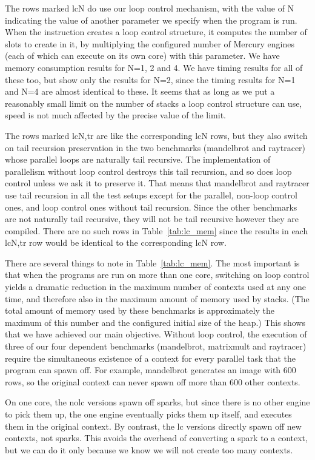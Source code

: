 The rows marked lcN do use our loop control mechanism,
with the value of N indicating
the value of another parameter we specify when the program is run.
When the  instruction
creates a loop control structure,
it computes the number of slots to create in it,
by multiplying the configured number of Mercury engines
(each of which can execute on its own core)
with this parameter.
We have memory consumption results for N=1, 2 and 4.
We have timing results for all of these too,
but show only the results for N=2,
since the timing results for N=1 and N=4 are almost identical to these.
It seems that as long as we put a reasonably small limit
on the number of stacks a loop control structure can use,
speed is not much affected by the precise value of the limit.

The rows marked lcN,tr are like the corresponding lcN rows,
but they also switch on tail recursion preservation
in the two benchmarks (mandelbrot and raytracer)
whose parallel loops are naturally tail recursive.
The implementation of parallelism without loop control
destroys this tail recursion,
and so does loop control unless we ask it to preserve it.
That means that mandelbrot and raytracer use tail recursion
in all the test setups except for
the parallel, non-loop control ones,
and loop control ones without tail recursion.
Since the other benchmarks are not naturally tail recursive,
they will not be tail recursive however they are compiled.
There are no such rows in Table~\ref{tab:lc_mem}
since the results in each lcN,tr row
would be identical to the corresponding lcN row.

There are several things to note in Table~\ref{tab:lc_mem}.
The most important is that when the programs are run on more than one core,
switching on loop control yields a dramatic reduction
in the maximum number of contexts used at any one time,
and therefore also in the maximum amount of memory used by stacks.
(The total amount of memory used by these benchmarks
is approximately the maximum of this number
and the configured initial size of the heap.)
This shows that we have achieved our main objective.
Without loop control, the execution of
three of our four dependent benchmarks (mandelbrot, matrixmult and raytracer)
require the simultaneous existence of a context
for every parallel task that the program can spawn off.
For example, mandelbrot generates an image with 600 rows,
so the original context can never spawn off more than 600 other contexts.

On one core, the nolc versions spawn off sparks,
but since there is no other engine to pick them up,
the one engine eventually picks them up itself,
and executes them in the original context.
By contrast, the lc versions directly spawn off new contexts, not sparks.
This avoids the overhead of converting a spark to a context,
but we can do it only because we know we will not create too many contexts.

